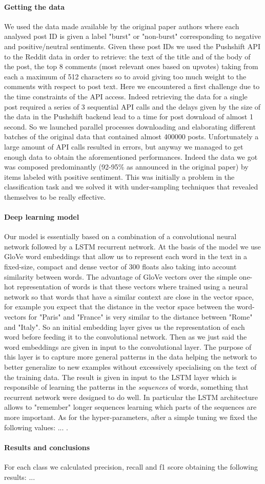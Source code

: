 \documentclass[a4paper, 9pt]{article}
\begin{document}
\paragraph{Getting the data}
We used the data made available by the original paper authors where each analysed post ID is given a label 
"burst" or "non-burst" corresponding to negative and positive/neutral sentiments. Given these post IDs we 
used the Pushshift API to the Reddit data in order to retrieve: the text of the title and of the body 
of the post, the top 8 comments (most relevant ones based on upvotes) taking from each a maximum of 512
characters so to avoid giving too much weight to the comments with respect to post text.
Here we encountered a first challenge due to the time constraints of the API access. Indeed retrieving the
data for a single post required a series of 3 sequential API calls and the delays given by the size of
the data in the Pushshift backend lead to a time for post download of almost 1 second. So we launched
parallel processes downloading and elaborating different batches of the original data that contained almost 
400000 posts. Unfortunately a large amount of API calls resulted in errors, but anyway we managed to get
enough data to obtain the aforementioned performances.
Indeed the data we got was composed predominantly (92-95\% as announced in the original paper) by items
labeled with positive sentiment. This was initially a problem in the classification task and we solved it 
with under-sampling techniques that revealed themselves to be really effective. 

\paragraph*{Deep learning model}
Our model is essentially based on a combination of a convolutional neural network followed by a LSTM 
recurrent network. At the basis of the model we use GloVe word embeddings that allow us to represent each
word in the text in a fixed-size, compact and dense vector of 300 floats also taking into account similarity
between words. The advantage of GloVe vectors over the simple one-hot representation of words is that these
vectors where trained using a neural network so that words that have a similar context are close in the
vector space, for example you expect that the distance in the vector space between the word-vectors for
"Paris" and "France" is very similar to the distance between "Rome" and "Italy". So an initial embedding
layer gives us the representation of each word before feeding it to the convolutional network.
Then as we just said the word embeddings are given in input to the convolutional layer. The purpose of this
layer is to capture more general patterns in the data helping the network to better generalize to new
examples without excessively specialising on the text of the training data. The result is given in input to
the LSTM layer which is responsible of learning the patterns in the \emph{sequences} of words, something
that recurrent network were designed to do well. In particular the LSTM architecture allows to "remember"
longer sequences learning which parts of the sequences are more important.
As for the hyper-parameters, after a simple tuning we fixed the following values: ... .

\paragraph*{Results and conclusions}
For each class we calculated precision, recall and f1 score obtaining the following results:
...
\end{document}
